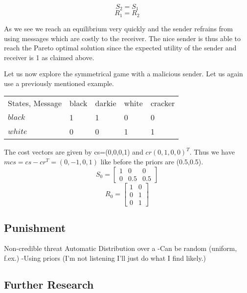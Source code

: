 \documentclass{article}
\begin{document}
\begin{equation*}
S_2=S_1
\end{equation*}
\begin{equation*}
R_1=R_2
\end{equation*}

As we see we reach an equilibrium very quickly and the sender refrains from using messages which are costly to the receiver. The nice sender is thus able to reach the Pareto optimal solution since the expected utility of the sender and receiver is 1 as claimed above.

Let us now explore the symmetrical game with a malicious sender. Let us again use a previously mentioned example.
\begin{table}[h]
\centering
\begin{tabular}{lllll}
States, Message & black & darkie & white & cracker \\
$black$  & 1      & 1    & 0        & 0   \\
$white$  & 0     & 0   & 1       & 1
\end{tabular}
\end{table}

The cost vectors are given by cs=(0,0,0,1) and $cr(0,1,0,0)^T$. Thus we have $mcs=cs - cr^T =(0,-1,0,1)$ like before the priors are (0.5,0.5).
\begin{equation*}
S_0=
\begin{bmatrix}
1 & 0 & 0\\
0 & 0.5 & 0.5
\end{bmatrix}
\end{equation*}
\begin{equation*}
R_0=
\begin{bmatrix}
1 & 0\\
0 & 1\\
0 & 1
\end{bmatrix}
\end{equation*}




\subsection{Punishment}
Non-credible threat
Automatic
Distribution over a
-Can be random (uniform, f.ex.)
-Using priors (I'm not listening I'll just do what I find likely.)

\subsection{Further Research}
\end{document}
